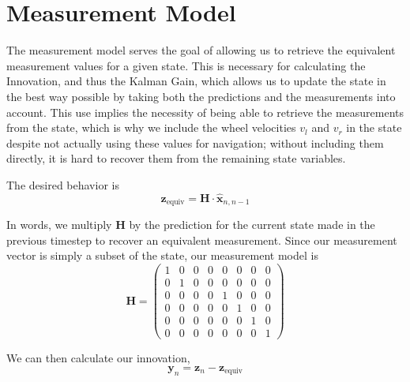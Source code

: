 \section{Measurement Model}

The measurement model serves the goal of allowing us to retrieve the equivalent measurement values for a given state. This is necessary for calculating the Innovation, and thus the Kalman Gain, which allows us to update the state in the best way possible by taking both the predictions and the measurements into account. This use implies the necessity of being able to retrieve the measurements from the state, which is why we include the wheel velocities $v_l$ and $v_r$ in the state despite not actually using these values for navigation; without including them directly, it is hard to recover them from the remaining state variables.

The desired behavior is
\begin{equation}
    \boldsymbol{z}_{\textrm{equiv}} = \boldsymbol{H} \cdot \boldsymbol{\hat{x}}_{n,n-1}
\end{equation}

In words, we multiply $\boldsymbol{H}$ by the prediction for the current state made in the previous timestep to recover an equivalent measurement. Since our measurement vector is simply a subset of the state, our measurement model is
\begin{equation}
    \boldsymbol{H} = 
    \begin{pmatrix}
    1 & 0 & 0 & 0 & 0 & 0 & 0 & 0 \\
    0 & 1 & 0 & 0 & 0 & 0 & 0 & 0 \\
    0 & 0 & 0 & 0 & 1 & 0 & 0 & 0 \\
    0 & 0 & 0 & 0 & 0 & 1 & 0 & 0 \\
    0 & 0 & 0 & 0 & 0 & 0 & 1 & 0 \\
    0 & 0 & 0 & 0 & 0 & 0 & 0 & 1
    \end{pmatrix}
\end{equation}

We can then calculate our innovation,
\begin{equation}
    \boldsymbol{y}_{n} = \boldsymbol{z}_{n} - \boldsymbol{z}_{\textrm{equiv}}
\end{equation}